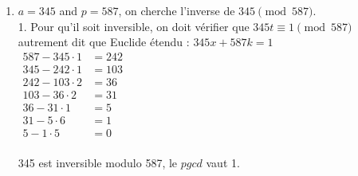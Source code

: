 \begin{solution}
\begin{enumerate}[label=(\alph*)]
        2. Fermat. On va tirer parti de la décomposition binaire.\\
        \(
        \begin{aligned}
            \text{Théorème : } 11^{47-2} \pmod{47} &= 11^{45} \pmod{47}\\
            \text{On écrit sous forme binaire : } 45 = 32 + 8 + 4+ 1 &= 2^5 + 2^3 + 2^2 + 2^0 \\
            11^{2} \equiv 121 &\equiv 27  \pmod{47} \\
            11^{4} \equiv 27^{2} \equiv 729 &\equiv 24  \pmod{47} \\
            11^{8} \equiv 24^{2} \equiv 576 &\equiv 12  \pmod{47} \\
            11^{16} \equiv 12^{2} \equiv 144 &\equiv 3  \pmod{47} \\
            11^{32} \equiv 3^{2} &\equiv 9  \pmod{47} \\
        \end{aligned}
        \)

        \( 11^{45} = 11^{32} \cdot 11^{8} \cdot 11^{4} \cdot 11 = 9 \cdot 12 \cdot 24 \cdot 11 = 9504 = 30 \pmod{47} \)

        \item $a = 345$ and $p = 587$, on cherche l'inverse de $345 \pmod{587}$. \\
        1. Pour qu'il soit inversible, on doit vérifier que $345t \equiv 1 \pmod{587}$ autrement dit que Euclide étendu : $345 x + 587 k = 1$ \\

        \(
        \begin{aligned}
            587 - 345 \cdot 1 &= 242 \\
            345 - 242 \cdot 1 &= 103 \\
            242 - 103 \cdot 2 &= 36 \\
            103 - 36 \cdot 2 &= 31 \\
            36 - 31 \cdot 1 &= 5 \\
            31 - 5 \cdot 6 &= 1 \\
            5 - 1 \cdot 5 &= 0 \\
        \end{aligned}
        \)

        345 est inversible modulo 587, le $pgcd$ vaut 1. \\


\end{enumerate}
\end{solution}
